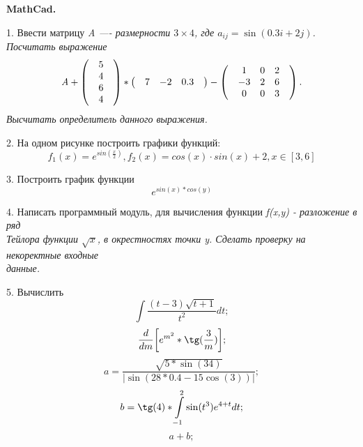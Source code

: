 \documentclass[11pt]{article}
\title{}
\author{}
\date{}
\begin{document}
\maketitle
\thispagestyle{empty}
\begin{center}\bf MathCad. \rm\end{center}
1. Ввести матрицу \it A \rm —- размерности $3 \times 4$, где $a_{ij} = \sin (0.3i+2j)$. Посчитать выражение
\[\it A \rm + 
\begin{pmatrix} 
& 5 & \\ 
& 4 & \\ 
& 6 & \\ 
& 4 & 
\end{pmatrix}
\ast 
\begin{pmatrix}
& 7 & -2 & 0.3 &
\end{pmatrix}
-
\begin{pmatrix}
& 1 & 0 & 2 &\\
& -3 & 2 & 6 &\\
& 0 & 0 & 3 &\\
\end{pmatrix}
.
\]
Высчитать определитель данного выражения.


2. На одном рисунке построить графики функций:
\begin {equation*}
	f_1(x)=e^{sin(\frac{x}{2})},
	f_2(x)=cos(x)\cdot sin(x)+2, x\in[3,6]
\end {equation*}


3. Построить график функции
\begin {equation*}
e^{sin(x) \ast cos(y)}
\end {equation*}


4. Написать программный модуль, для вычисления функции \it f(x,y) \rm - разложение в ряд \\Тейлора функции $ \sqrt{x} $, в окрестностях точки y. Сделать проверку на некоректные входные \\данные.	

5. Вычислить
\begin {equation*}
	\int \frac{(t-3)\sqrt{t+1}}{t^2}dt;
\end {equation*}
\begin {equation*}
	\frac{d}{dm}\biggl[e^{m^2} \ast \tg(\frac{3}{m})\biggr];
\end {equation*}
\begin {equation*}
	a=\frac{\sqrt{5 \ast \sin(34)}}{|\sin(28 \ast 0.4 - 15\cos(3))|};
\end {equation*}
\begin {equation*}
	b=\tg(4) \ast \int\limits_{-1}^2 \sin(t^3)e^{4+t}dt;
\end {equation*}
\begin {equation*}
	a+b;
\end {equation*}
\end{document}
